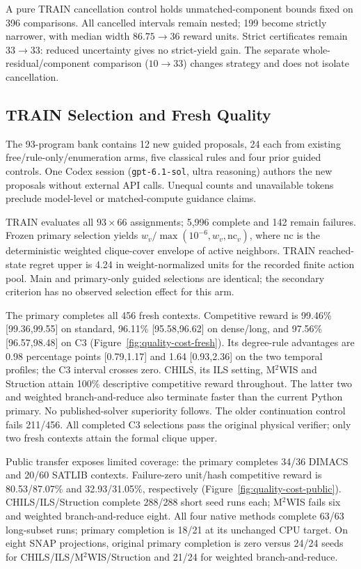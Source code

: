 A pure TRAIN cancellation control holds unmatched-component bounds fixed on
396 comparisons. All cancelled intervals remain nested; 199 become strictly
narrower, with median width $86.75\to36$ reward units. Strict certificates remain
$33\to33$: reduced uncertainty gives no strict-yield gain. The separate
whole-residual/component comparison ($10\to33$) changes strategy and does not
isolate cancellation.

\subsection{TRAIN Selection and Fresh Quality}
\label{sec:experiments:selection}
The 93-program bank contains 12 new guided proposals, 24 each from existing
free/rule-only/enumeration arms, five classical rules and four prior guided
controls. One Codex session (\texttt{gpt-6.1-sol}, ultra reasoning) authors the
new proposals without external API calls. Unequal counts and unavailable
tokens preclude model-level or matched-compute guidance claims.

TRAIN evaluates all $93\times66$ assignments; 5,996 complete and 142 remain
failures. Frozen primary selection yields
$w_v/\max(10^{-6},w_v,\mathrm{nc}_v)$, where $\mathrm{nc}$ is the deterministic
weighted clique-cover envelope of active neighbors. TRAIN reached-state regret
upper is 4.24 in weight-normalized units for the recorded finite action pool.
Main and primary-only guided selections are identical; the secondary criterion
has no observed selection effect for this arm.

The primary completes all 456 fresh contexts. Competitive reward is
99.46\% [99.36,99.55] on standard, 96.11\% [95.58,96.62] on dense/long, and
97.56\% [96.57,98.48] on C3 (Figure~\ref{fig:quality-cost-fresh}). Its degree-rule
advantages are 0.98 percentage points [0.79,1.17] and 1.64 [0.93,2.36] on
the two temporal profiles; the C3 interval crosses zero. CHILS, its ILS setting,
M$^2$WIS and Struction attain 100\% descriptive competitive reward throughout.
The latter two and weighted branch-and-reduce also terminate faster than the
current Python primary. No published-solver superiority follows.
The older continuation control fails 211/456. All completed C3 selections pass
the original physical verifier; only two fresh contexts attain the formal
clique upper.

Public transfer exposes limited coverage: the primary completes 34/36 DIMACS
and 20/60 SATLIB contexts. Failure-zero unit/hash competitive reward is
80.53/87.07\% and 32.93/31.05\%, respectively
(Figure~\ref{fig:quality-cost-public}). CHILS/ILS/Struction complete 288/288
short seed runs each; M$^2$WIS fails six and weighted branch-and-reduce eight.
All four native methods complete 63/63 long-subset runs; primary completion
is 18/21 at its unchanged CPU target. On eight SNAP projections, original
primary completion is zero versus 24/24 seeds for CHILS/ILS/M$^2$WIS/Struction
and 21/24 for weighted branch-and-reduce.

